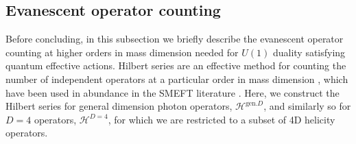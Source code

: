 \documentclass[12pt,letter]{article}
\begin{document}
\subsection{Evanescent operator counting}\label{sec:EOpsCounting}
Before concluding, in this subsection we briefly describe the evanescent operator counting at higher orders in mass dimension needed for $U(1)$ duality satisfying quantum effective actions. Hilbert series are an effective method for counting the number of independent operators at a particular order in mass dimension \cite{Henning:2015daa,Lehman:2015via}, which have been used in abundance in the SMEFT literature \cite{Fonseca:2019yya,Hays:2018zze,Alioli:2022fng}. Here, we construct the Hilbert series for general dimension photon operators, $\mathcal{H}^{\text{gen.}D}$, and similarly so for $D=4$ operators, $\mathcal{H}^{D=4}$, for which we are restricted to a subset of 4D helicity operators. 
\end{document}
